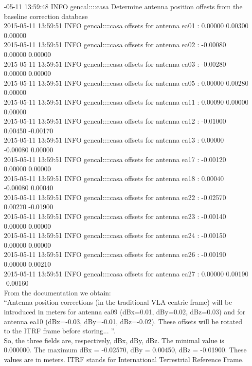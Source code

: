 \documentclass[12pt, a4paper]{article}
\begin{document}
{\tiny {}-05-11 13:59:48	INFO	gencal::::casa	 Determine antenna position offests from the baseline correction database \\
2015-05-11 13:59:51	INFO	gencal::::casa	offsets for antenna ea01 :  0.00000   0.00300   0.00000 \\
2015-05-11 13:59:51	INFO	gencal::::casa	offsets for antenna ea02 : -0.00080   0.00000   0.00000 \\
2015-05-11 13:59:51	INFO	gencal::::casa	offsets for antenna ea03 : -0.00280   0.00000   0.00000 \\
2015-05-11 13:59:51	INFO	gencal::::casa	offsets for antenna ea05 :  0.00000   0.00280   0.00000 \\
2015-05-11 13:59:51	INFO	gencal::::casa	offsets for antenna ea11 :  0.00090   0.00000   0.00000 \\
2015-05-11 13:59:51	INFO	gencal::::casa	offsets for antenna ea12 : -0.01000   0.00450  -0.00170 \\
2015-05-11 13:59:51	INFO	gencal::::casa	offsets for antenna ea13 :  0.00000  -0.00080   0.00000 \\
2015-05-11 13:59:51	INFO	gencal::::casa	offsets for antenna ea17 : -0.00120   0.00000   0.00000 \\
2015-05-11 13:59:51	INFO	gencal::::casa	offsets for antenna ea18 :  0.00040  -0.00080   0.00040 \\
2015-05-11 13:59:51	INFO	gencal::::casa	offsets for antenna ea22 : -0.02570   0.00270  -0.01900 \\
2015-05-11 13:59:51	INFO	gencal::::casa	offsets for antenna ea23 : -0.00140   0.00000   0.00000 \\
2015-05-11 13:59:51	INFO	gencal::::casa	offsets for antenna ea24 : -0.00150   0.00000   0.00000 \\
2015-05-11 13:59:51	INFO	gencal::::casa	offsets for antenna ea26 : -0.00190   0.00000   0.00210 \\
2015-05-11 13:59:51	INFO	gencal::::casa	offsets for antenna ea27 :  0.00000   0.00190  -0.00160 } \\

From the documentation we obtain: \\
``Antenna position corrections (in the traditional VLA-centric frame) will be introduced in meters for antenna ea09 (dBx=0.01, dBy=0.02, dBz=0.03) and for antenna ea10 (dBx=-0.03, dBy=-0.01, dBz=-0.02). These offsets will be rotated to the ITRF frame before storing... ''. \\

So, the three fields are, respectively, dBx, dBy, dBz. The minimal value is 0.000000. The maximum dBx = -0.02570, dBy = 0.00450, dBz = -0.01900. These values are in meters. ITRF stands for International Terrestrial Reference Frame.
\end{document}
